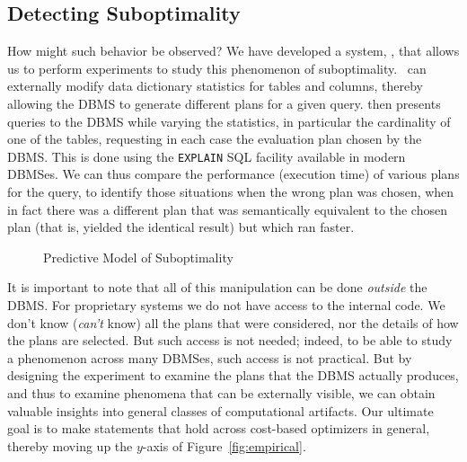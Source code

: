 \subsection{Detecting Suboptimality}


How might such behavior be observed? We have developed a system, \azdb, that
allows us to perform experiments to study this phenomenon of suboptimality.
\azdb\ can externally modify data
dictionary statistics for tables and columns, thereby allowing the DBMS to
generate different plans for a given query.
\hbox{\azdb} then presents queries to the DBMS while varying
the statistics, in particular the cardinality of one of the tables,
requesting in each case the evaluation plan chosen by the DBMS.
This is done using the
{\tt EXPLAIN} SQL facility available in modern DBMSes. We can thus compare
the performance (execution time) of various plans for the query, to identify those
situations when the wrong plan was chosen, when in fact there was a
different plan that was semantically equivalent to the chosen plan (that is,
yielded the identical result) but which ran faster.

\begin{figure*}[tb]
\centering
\caption{Predictive Model of Suboptimality\label{fig:model}}
\end{figure*}

It is important to note that all of this manipulation can be done {\em
  outside} the DBMS. For proprietary systems we do not have access to the
internal code. We don't know ({\em can't} know) all the plans that were
considered, nor the details of how the plans are selected. But such access
is not needed; indeed, to be able to study a phenomenon across many DBMSes,
such access is not practical. But by designing the experiment to examine
the plans that the DBMS actually produces, and thus to examine phenomena
that can be externally visible, we can obtain valuable insights into general
classes of computational artifacts. Our ultimate goal is to make statements
that hold across cost-based optimizers in general, thereby moving up the
$y$-axis of Figure~\ref{fig:empirical}.


